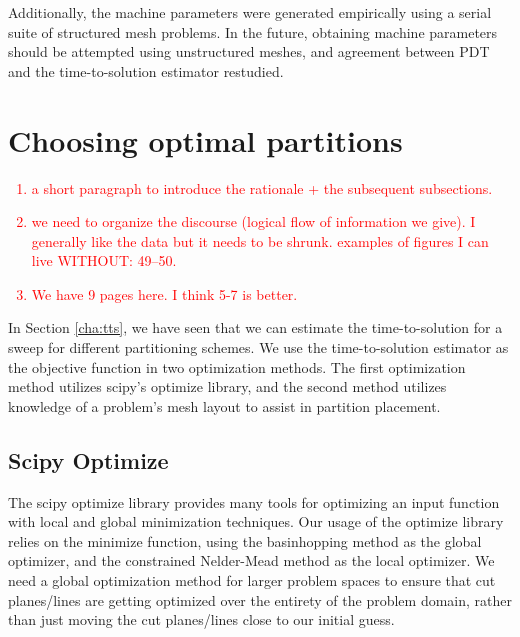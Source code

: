 \documentclass[times,final]{elsarticle}
\newcommand{\tcr}[1]{\textcolor{red}{#1}}
\begin{document}
Additionally, the machine parameters were generated empirically using a serial suite of structured mesh problems.
In the future, obtaining machine parameters should be attempted using unstructured meshes, and agreement between PDT and the time-to-solution estimator restudied.

\section{Choosing optimal partitions}\label{cha:optimization}
\tcr{
\begin{enumerate}
\item a short paragraph to introduce the rationale + the subsequent subsections.
\item we need to organize the discourse (logical flow of information we give). I generally like the data but it needs to be shrunk. examples of figures I can live WITHOUT: 49--50.
\item We have 9 pages here. I think 5-7 is better.
\end{enumerate}
}
In Section \ref{cha:tts}, we have seen that we can estimate the time-to-solution for a sweep for different partitioning schemes.
We use the time-to-solution estimator as the objective function in two optimization methods.
The first optimization method utilizes scipy's optimize library, and the second method utilizes knowledge of a problem's mesh layout to assist in partition placement.

\subsection{Scipy Optimize}
The scipy optimize library \cite{scipy} provides many tools for optimizing an input function with local and global minimization techniques.
Our usage of the optimize library relies on the minimize function, using the basinhopping \cite{basinhoppingwales} method as the global optimizer, and the constrained Nelder-Mead method as the local optimizer.
We need a global optimization method for larger problem spaces to ensure that cut planes/lines are getting optimized over the entirety of the problem domain, rather than just moving the cut planes/lines close to our initial guess.
\end{document}
